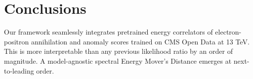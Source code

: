 \section{Conclusions}\label{sec:conclusions}

Our framework seamlessly integrates pretrained energy correlators of
electron-positron annihilation and anomaly scores trained on CMS Open
Data at 13 TeV. This is more interpretable than any previous likelihood
ratio by an order of magnitude. A model-agnostic spectral Energy Mover's
Distance emerges at next-to-leading order.

